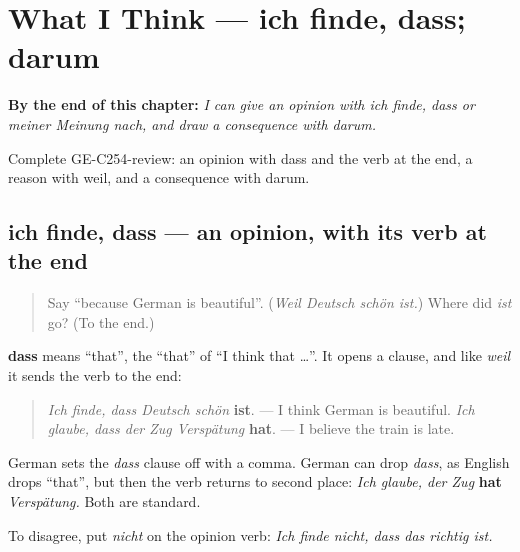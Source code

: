 
\chapter{What I Think — ich finde, dass; darum}
\label{ch:ge-what-i-think}

\begin{chapteropening}
\textbf{By the end of this chapter:} \emph{I can give an opinion with ich finde, dass or meiner Meinung nach, and draw a consequence with darum.}

Complete GE-C254-review: an opinion with dass and the verb at the end, a reason with weil, and a consequence with darum.
\end{chapteropening}

\section[ich finde, dass …]{ich finde, dass — an opinion, with its verb at the end}

\label{lesson:GE-C254-ich-finde-dass}



\begin{quote}
Say \textquotedblleft{}because German is beautiful\textquotedblright{}. (\emph{Weil Deutsch schön ist.}) Where did \emph{ist} go? (To the end.)
\end{quote}

\begin{grammarlens}[title={Grammar Lens: dass does what weil does}]
\textbf{dass} means \textquotedblleft{}that\textquotedblright{}, the \textquotedblleft{}that\textquotedblright{} of \textquotedblleft{}I think that …\textquotedblright{}. It opens a clause, and like \emph{weil} it sends the verb to the end:

\begin{quote}
\emph{Ich finde, dass Deutsch schön} \textbf{ist}. — I think German is beautiful. \emph{Ich glaube, dass der Zug Verspätung} \textbf{hat}. — I believe the train is late.
\end{quote}

German sets the \emph{dass} clause off with a comma. German can drop \emph{dass}, as English drops \textquotedblleft{}that\textquotedblright{}, but then the verb returns to second place: \emph{Ich glaube, der Zug} \textbf{hat} \emph{Verspätung.} Both are standard.

To disagree, put \emph{nicht} on the opinion verb: \emph{Ich finde nicht, dass das richtig ist.}
\end{grammarlens}

